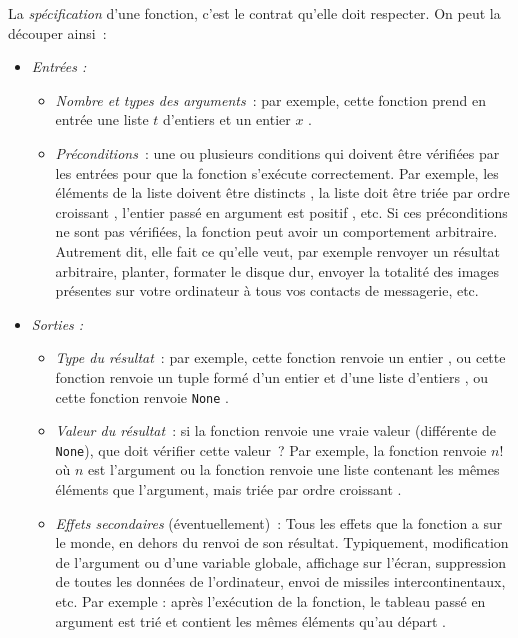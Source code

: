 \documentclass{magnolia}
\begin{document}
La \emph{spécification} d'une fonction, c'est le contrat qu'elle doit respecter.
On peut la découper ainsi~:
\begin{itemize}
  \item \emph{Entrées :}
  \begin{itemize}
    \item \emph{Nombre et types des arguments}~: par exemple, \og cette fonction prend
          en entrée une liste $t$ d'entiers et un entier $x$ \fg.
    \item \emph{Préconditions}~: une ou plusieurs conditions qui doivent
    être vérifiées par les entrées pour que la fonction s'exécute correctement.
    Par exemple, \og les éléments de la liste doivent être distincts \fg,
          \og la liste doit être triée par ordre croissant \fg,
          \og l'entier passé en argument est positif \fg, etc.
    Si ces préconditions ne sont pas vérifiées, la fonction peut avoir un comportement
    arbitraire. Autrement dit, elle fait ce qu'elle veut, par exemple
    renvoyer un résultat arbitraire, planter, formater le disque dur,
      envoyer la totalité des images présentes sur votre ordinateur à tous vos
      contacts de messagerie, etc.
  \end{itemize}
  \item \emph{Sorties :}
  \begin{itemize}
    \item \emph{Type du résultat}~: par exemple, \og cette fonction renvoie un entier \fg,
    ou \og cette fonction renvoie un tuple formé d'un entier et d'une liste d'entiers \fg, ou
    \og cette fonction renvoie \verb!None! \fg.
    \item \emph{Valeur du résultat}~: si la fonction renvoie une \og vraie \fg valeur
          (différente de \verb!None!), que doit vérifier cette valeur~?
          Par exemple, \og la fonction renvoie $n!$ où $n$ est l'argument \fg ou
          \og la fonction renvoie une liste contenant les mêmes éléments que
          l'argument, mais triée par ordre croissant \fg.
    \item \emph{Effets secondaires} (éventuellement)~: Tous les effets que la fonction
    a sur le monde, en dehors du renvoi de son résultat. Typiquement, modification
          de l'argument ou d'une variable globale, affichage sur l'écran, suppression de toutes
          les données de l'ordinateur, envoi de missiles intercontinentaux, etc.
          Par exemple : \og après l'exécution de la fonction, le tableau passé en
          argument est trié et contient les mêmes éléments qu'au départ \fg.
  \end{itemize}
\end{itemize}
\end{document}
